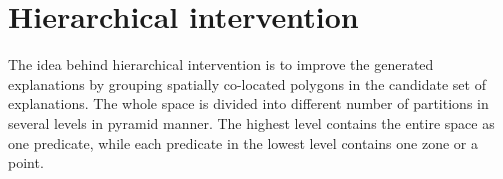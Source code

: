 





\section{Hierarchical intervention}
\label{sec:hei_intervention}



The idea behind hierarchical intervention is to improve the generated explanations by grouping spatially co-located polygons in the candidate set of explanations. The whole space is divided into different number of partitions in several levels in pyramid manner. The highest level contains the entire space as one predicate, while each predicate in the lowest level contains one zone or a point.



